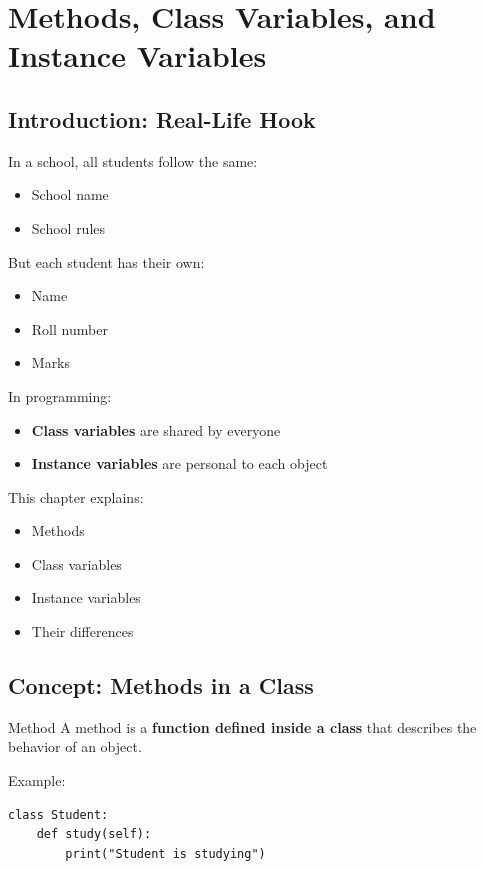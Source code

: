 \chapter{Methods, Class Variables, and Instance Variables}

\section{Introduction: Real-Life Hook}

In a school, all students follow the same:
\begin{itemize}
    \item School name
    \item School rules
\end{itemize}

But each student has their own:
\begin{itemize}
    \item Name
    \item Roll number
    \item Marks
\end{itemize}

In programming:
\begin{itemize}
    \item \textbf{Class variables} are shared by everyone
    \item \textbf{Instance variables} are personal to each object
\end{itemize}

This chapter explains:
\begin{itemize}
    \item Methods
    \item Class variables
    \item Instance variables
    \item Their differences
\end{itemize}

\section{Concept: Methods in a Class}

\begin{definition}{Method}
A method is a \textbf{function defined inside a class} that describes the behavior of an object.
\end{definition}

Example:
\begin{verbatim}
class Student:
    def study(self):
        print("Student is studying")
\end{verbatim}

